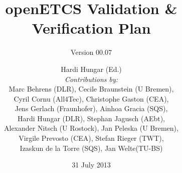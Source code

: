 \documentclass{template/openetcs_report}
\begin{document}
\frontmatter
{}




\title{openETCS Validation \& Verification Plan}

\subtitle{Version 00.07}

\date{31 July 2013}


\author{
Hardi Hungar (Ed.)\\
{\it Contributions by:} \\
 Marc Behrens (DLR),
  Cecile Braunstein (U Bremen), \\
Cyril Cornu (All4Tec), Christophe Gaston (CEA),\\ 
Jens Gerlach (Fraunhofer), Ainhoa Gracia (SQS), \\
Hardi Hungar (DLR), Stephan Jagusch (AEbt),\\
 Alexander Nitsch (U Rostock), Jan Peleska (U Bremen),\\
  Virgile Prevosto (CEA),  Stefan Rieger (TWT),\\ 
Izaskun de la Torre (SQS), Jan Welte(TU-BS)}


  

\end{document}
